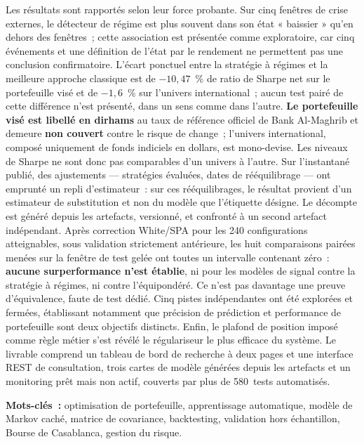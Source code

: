 Les résultats sont rapportés selon leur force probante. Sur cinq fenêtres de
crise externes, le détecteur de régime est plus souvent dans son état « baissier »
qu'en dehors des fenêtres~; cette association est présentée comme exploratoire,
car cinq événements et une définition de l'état par le rendement ne permettent
pas une conclusion confirmatoire. L'écart ponctuel entre la stratégie à
régimes et la meilleure approche classique est de $-10{,}47$~\% de ratio de
Sharpe net sur le portefeuille visé et de $-1{,}6$~\% sur l'univers
international~; aucun test pairé de cette différence n'est présenté, dans un sens
comme dans l'autre. \textbf{Le portefeuille visé est libellé en dirhams} au taux
de référence officiel de Bank Al-Maghrib et demeure \textbf{non couvert} contre
le risque de change~; l'univers international, composé uniquement de fonds
indiciels en dollars, est mono-devise. Les niveaux de Sharpe ne sont donc pas
comparables d'un univers à l'autre. Sur l'instantané publié,
\integriteReplis{} des \integriteAjustements{} ajustements — \integriteStrategies{}
stratégies évaluées, \integriteDates{} dates de rééquilibrage — ont emprunté un
repli d'estimateur~: sur ces rééquilibrages, le résultat provient d'un estimateur
de substitution et non du modèle que l'étiquette désigne. Le décompte est
généré depuis les artefacts, versionné, et confronté à un second artefact
indépendant. Après correction White/SPA pour les 240 configurations
atteignables, sous validation strictement antérieure, les huit
comparaisons pairées menées sur la fenêtre de test gelée ont toutes un intervalle
contenant zéro~: \textbf{aucune surperformance n'est établie}, ni pour les
modèles de signal contre la stratégie à régimes, ni contre l'équipondéré. Ce
n'est pas davantage une preuve d'équivalence, faute de test dédié. Cinq pistes indépendantes ont
été explorées et fermées, établissant notamment que précision de prédiction et
performance de portefeuille sont deux objectifs distincts. Enfin, le plafond de
position imposé comme règle métier s'est révélé le régulariseur le plus efficace
du système. Le livrable comprend un tableau de bord de recherche à deux pages et
une interface REST de consultation, trois cartes de modèle générées depuis les
artefacts et un monitoring prêt mais non actif, couverts par plus de 580~tests
automatisés.

\vspace{0.6em}
\noindent\textbf{Mots-clés~:} optimisation de portefeuille, apprentissage
automatique, modèle de Markov caché, matrice de covariance, backtesting,
validation hors échantillon, Bourse de Casablanca, gestion du risque.

